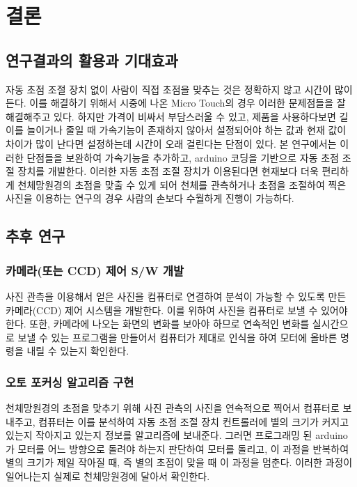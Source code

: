 \documentclass{abstract_hutech}
\begin{document}
\section{결론}

\subsection{연구결과의 활용과 기대효과}

자동 초점 조절 장치 없이 사람이 직접 초점을 맞추는 것은 정확하지 않고 시간이 많이 든다. 이를 해결하기 위해서 시중에 나온 Micro Touch의 경우 이러한 문제점들을 잘 해결해주고 있다. 하지만 가격이 비싸서 부담스러울 수 있고, 제품을 사용하다보면 길이를 늘이거나 줄일 때 가속기능이 존재하지 않아서 설정되어야 하는 값과 현재 값이 차이가 많이 난다면 설정하는데 시간이 오래 걸린다는 단점이 있다. 본 연구에서는 이러한 단점들을 보완하여 가속기능을 추가하고, arduino 코딩을 기반으로 자동 초점 조절 장치를 개발한다. 이러한 자동 초점 조절 장치가 이용된다면 현재보다 더욱 편리하게 천체망원경의 초점을 맞출 수 있게 되어 천체를 관측하거나 초점을 조절하여 찍은 사진을 이용하는 연구의 경우 사람의 손보다 수월하게 진행이 가능하다.

\subsection{추후 연구}

\subsubsection{카메라(또는 CCD) 제어 S/W 개발}

사진 관측을 이용해서 얻은 사진을 컴퓨터로 연결하여 분석이 가능할 수 있도록 만든 카메라(CCD) 제어 시스템을 개발한다. 이를 위하여 사진을 컴퓨터로 보낼 수 있어야 한다. 또한, 카메라에 나오는 화면의 변화를 보아야 하므로 연속적인 변화를 실시간으로 보낼 수 있는 프로그램을 만들어서 컴퓨터가 제대로 인식을 하여 모터에 올바른 명령을 내릴 수 있는지 확인한다.

\subsubsection{오토 포커싱 알고리즘 구현}

천체망원경의 초점을 맞추기 위해 사진 관측의 사진을 연속적으로 찍어서 컴퓨터로 보내주고, 컴퓨터는 이를 분석하여 자동 초점 조절 장치 컨트롤러에 별의 크기가 커지고 있는지 작아지고 있는지 정보를 알고리즘에 보내준다. 그러면 프로그래밍 된 arduino가 모터를 어느 방향으로 돌려야 하는지 판단하여 모터를 돌리고, 이 과정을 반복하여 별의 크기가 제일 작아질 때, 즉 별의 초점이 맞을 때 이 과정을 멈춘다. 이러한 과정이 일어나는지 실제로 천체망원경에 달아서 확인한다.


\end{document}
